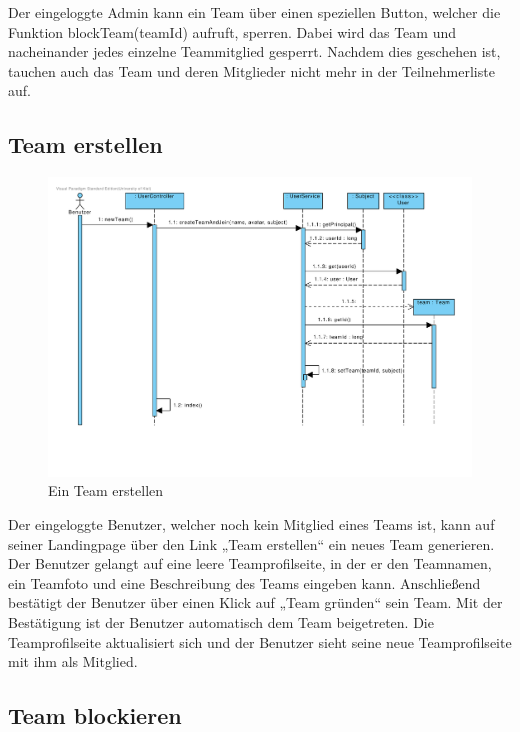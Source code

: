 Der eingeloggte Admin kann ein Team über einen speziellen Button, welcher die Funktion blockTeam(teamId) aufruft, sperren. Dabei wird das Team und nacheinander jedes einzelne Teammitglied gesperrt. Nachdem dies geschehen ist, tauchen auch das Team und deren Mitglieder nicht mehr in der Teilnehmerliste auf.

\subsection{Team erstellen}
\begin{figure}[H]
  \centering
  \includegraphics[width=\textwidth, clip]{gfx/team_erstellen}
  \caption{Ein Team erstellen}
\end{figure}

Der eingeloggte Benutzer, welcher noch kein Mitglied eines Teams ist,
kann auf seiner Landingpage über den Link „Team erstellen“ ein neues
Team generieren. Der Benutzer gelangt auf eine leere Teamprofilseite,
in der er den Teamnamen, ein Teamfoto und eine Beschreibung des Teams
eingeben kann. Anschließend bestätigt der Benutzer über einen Klick
auf „Team gründen“ sein Team. Mit der Bestätigung ist der Benutzer
automatisch dem Team beigetreten. Die Teamprofilseite aktualisiert
sich und der Benutzer sieht seine neue Teamprofilseite mit ihm als
Mitglied.\\

\subsection{Team blockieren}

